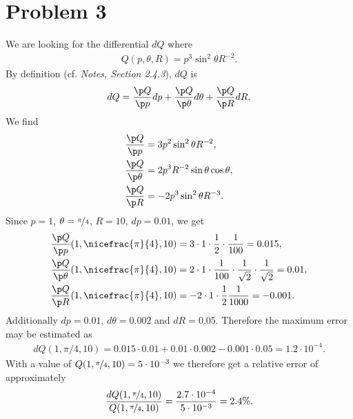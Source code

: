 \documentclass{article}
\begin{document}
\section*{Problem 3}
We are looking for the differential $dQ$ where
\begin{align*}
	Q(p, \theta, R)=p^3\sin^2\theta R^{-2}.
\end{align*}
By definition (cf. \emph{Notes, Section 2.4.3}), $dQ$ is
\begin{align*}
	dQ=\frac{\p Q}{\p p}dp + \frac{\p Q}{\p\theta}d\theta + \frac{\p Q}{\p R}dR.
\end{align*}
We find
\begin{align*}
	\frac{\p Q}{\p p}     & = 3p^2\sin^2\theta R^{-2},        \\
	\frac{\p Q}{\p\theta} & = 2p^3R^{-2}\sin\theta\cos\theta, \\
	\frac{\p Q}{\p R}     & =-2p^3\sin^2\theta R^{-3}.
\end{align*}
Since $p=1$, $\theta=\nicefrac{\pi}{4}$, $R=10$, $dp=0.01$, we get
\begin{align*}
	\frac{\p Q}{\p p}(1, \nicefrac{\pi}{4}, 10)
	 & =3\cdot 1 \cdot \frac{1}{2} \cdot \frac{1}{100}=0.015,                             \\
	\frac{\p Q}{\p\theta}(1, \nicefrac{\pi}{4}, 10)
	 & =2\cdot 1 \cdot \frac{1}{100}\cdot\frac{1}{\sqrt{2}}\cdot\frac{1}{\sqrt{2}} =0.01, \\
	\frac{\p Q}{\p R}(1, \nicefrac{\pi}{4}, 10)
	 & = -2\cdot 1 \cdot \frac{1}{2}\frac{1}{1000}=-0.001.
\end{align*}
Additionally $dp = 0.01$, $d\theta = 0.002$ and $dR=0.05$.
Therefore the maximum error may be estimated as
\begin{align*}
	dQ(1,\pi/4,10)=0.015\cdot 0.01+0.01\cdot 0.002  -0.001 \cdot 0.05=1.2\cdot10^{-4}.
\end{align*}
With a value of $Q(1,\nicefrac{\pi}{4},10)=5\cdot10^{-3}$ we therefore get a
relative error of approximately
\begin{align*}
	\frac{dQ(1,\nicefrac{\pi}{4},10)}{Q(1,\nicefrac{\pi}{4},10)}=\frac{2.7\cdot10^{-4}}{5\cdot 10^{-3}}=2.4\%.
\end{align*}
\end{document}
